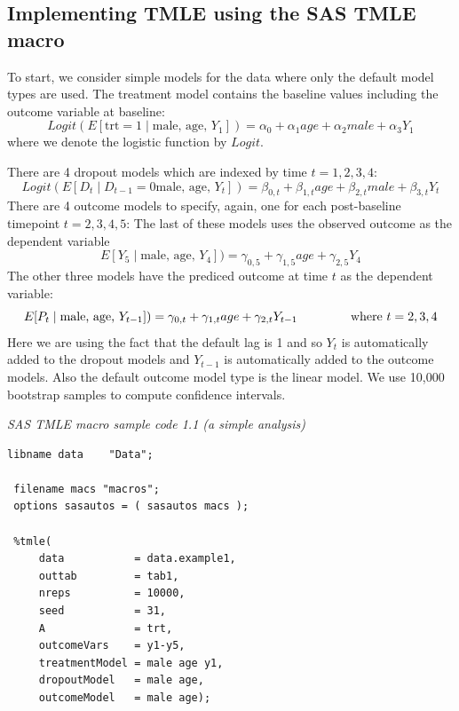\documentclass[10pt]{article}
\renewcommand{\baselinestretch}{1.3}
\begin{document}
\subsection*{Implementing TMLE using the SAS TMLE macro}\label{SASexamples}

To start, we consider simple models for the data where only the default model types are used.  The treatment model contains the baseline values including the outcome variable at baseline:
$$ Logit( E[ \mbox{trt} = 1 \mid  \mbox{male, age, } Y_1 ] ) =  \alpha_0 + \alpha_1 age + \alpha_2 male + \alpha_3 Y_1 $$
where we denote the logistic function by $Logit$.

There are 4 dropout models which are indexed by time $t = 1, 2, 3, 4$:
$$ Logit( E[ D_{t} \mid D_{t-1}=0 \mbox{male, age, } Y_t ] ) =  \beta_{0,t} + \beta_{1,t} age + \beta_{2,t} male + \beta_{3,t} Y_t $$
There are 4 outcome models to specify, again, one for each post-baseline timepoint $t = 2, 3, 4, 5$:  The last of these models uses the observed outcome as the dependent variable
\[ E[ Y_5 \mid  \mbox{male, age, } Y_4 ] ) =  \gamma_{0,5} + \gamma_{1,5} age + \gamma_{2,5} Y_4 \]
The other three models have the prediced outcome at time $t$ as the dependent variable:
\[ E[ P_{t} \mid  \mbox{male, age, } Y_{t-1} ] ) =  \gamma_{0,t} + \gamma_{1,t} age + \gamma_{2,t} Y_{t-1} \mbox{\ \hspace{0.5in} where } t=2,3,4 \]
Here we are using the fact that the default lag is 1 and so $Y_t$ is automatically added to the dropout models and $Y_{t-1}$ is automatically added to the outcome models.  Also the default outcome model type is the linear model.
We use 10,000 bootstrap samples to compute confidence intervals.
\newpage
\begin{minipage}{\textwidth}
\renewcommand{\baselinestretch}{1.0}\selectfont%
\begin{minipage}[l]{5.6in}
\normalsize\em%
SAS TMLE macro sample code 1.1 (a simple analysis) 
\end{minipage}\vspace{-0.08in}
\begin{Verbatim}[baselinestretch=1.0, fontsize=\small, frame=single, commandchars=\\\{\}]
 libname data    "Data";

 filename macs "macros";
 options sasautos = ( sasautos macs );

 %tmle(
     data           = data.example1,
     outtab         = tab1,
     nreps          = 10000,
     seed           = 31,
     A              = trt,
     outcomeVars    = y1-y5,
     treatmentModel = male age y1,
     dropoutModel   = male age,
     outcomeModel   = male age);
\end{Verbatim}
\end{minipage}
\vspace{0.2in}
\end{document}
